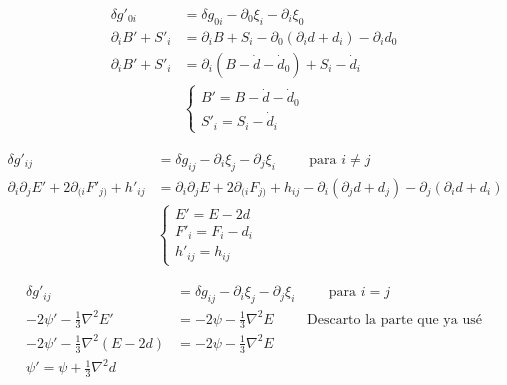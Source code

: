 \begin{equation}
    \begin{split}
        \delta g'_{0i} &= \delta g_{0i} - \partial_0 \xi_i - \partial_i \xi_0\\
    \partial_i B' + S'_i &= \partial_i B + S_i - \partial_0 \left( \partial_i d + d_i \right) - \partial_i d_0\\
    \partial_i B' + S'_i &= \partial_i \left( B - \dot{d} - \dot{d}_0 \right) + S_i - \dot{d}_i\\
    &\begin{cases}
        \displaystyle B' = B - \dot{d} - \dot{d}_0\\
        \displaystyle S'_i = S_i - \dot{d}_i
    \end{cases}
    \end{split}
\end{equation}

\begin{equation}
    \begin{split}
        \delta g'_{ij} &= \delta g_{ij} - \partial_i \xi_j - \partial_j \xi_i \hspace{1cm} \text{para $i \neq j$}\\
        \partial_i \partial_j E' + 2 \partial_{(i} F'_{j)} + h'_{ij} &= \partial_i \partial_j E + 2 \partial_{(i} F_{j)} + h_{ij} - \partial_i \left( \partial_j d + d_j \right) - \partial_j \left( \partial_i d + d_i \right)\\
        &\begin{cases}
            \displaystyle E' = E - 2d\\
            F'_i = F_i - d_i\\
            h'_{ij} = h_{ij}
        \end{cases}
    \end{split}
\end{equation}

\begin{equation}
    \begin{split}
        \delta g'_{ij} &= \delta g_{ij} - \partial_i \xi_j - \partial_j \xi_i \hspace{1cm} \text{para $i = j$}\\
        - 2 \psi' - \frac{1}{3} \nabla^2 E' &= - 2 \psi - \frac{1}{3} \nabla^2 E \hspace{1cm} \text{Descarto la parte que ya usé}\\
        - 2 \psi' - \frac{1}{3} \nabla^2 \left( E - 2 d \right) &= - 2 \psi - \frac{1}{3} \nabla^2 E\\
        \psi' = \psi + \frac{1}{3} \nabla^2 d
    \end{split}
\end{equation}


